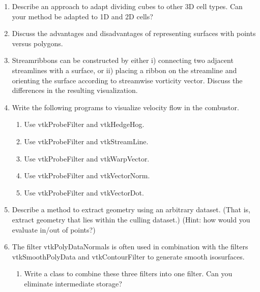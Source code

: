\begin{enumerate}

\item Describe an approach to adapt dividing cubes to other 3D cell types. Can your method be adapted to 1D and 2D cells?

\item Discuss the advantages and disadvantages of representing surfaces with points versus polygons.

\item Streamribbons can be constructed by either i) connecting two adjacent streamlines with a surface, or ii) placing a ribbon on the streamline and orienting the surface according to streamwise vorticity vector. Discuss the differences in the resulting visualization.

\item Write the following programs to visualize velocity flow in the combustor.

    \begin{enumerate}

    \item Use vtkProbeFilter and vtkHedgeHog.

    \item Use vtkProbeFilter and vtkStreamLine.

    \item Use vtkProbeFilter and vtkWarpVector.

    \item Use vtkProbeFilter and vtkVectorNorm.

    \item Use vtkProbeFilter and vtkVectorDot.

    \end{enumerate}

\item Describe a method to extract geometry using an arbitrary dataset. (That is, extract geometry that lies within the culling dataset.) (Hint: how would you evaluate in/out of points?)

\item The filter vtkPolyDataNormals is often used in combination with the filters vtkSmoothPolyData and vtkContourFilter to generate smooth isosurfaces.

    \begin{enumerate}

    \item Write a class to combine these three filters into one filter. Can you eliminate intermediate storage?


\end{enumerate}
\end{enumerate}
